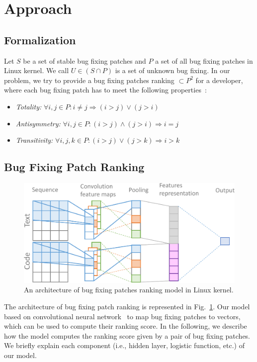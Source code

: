 \section{Approach}
\label{sec:approach}
\subsection{Formalization}
\label{sec:formalization}

Let $S$ be a set of stable bug fixing patches and $P$ a set of all bug fixing patches in Linux kernel. We call $U \in (S \cap P ) $ is a set of unknown bug fixing. In our problem, we try to provide a bug fixing patches ranking $\subset P^2$ for a developer, where each bug fixing patch has to meet the following properties~\cite{rendle2009bpr}:
\begin{itemize}
	\item \textit{Totality:} $\forall i,j \in P: i \neq j \Rightarrow (i > j) \vee (j > i)$
	\item \textit{Antisymmetry:} $\forall i,j \in P: (i > j) \wedge (j > i) \Rightarrow i = j$ 
	\item \textit{Transitivity:} $\forall i,j,k \in P: (i > j) \vee (j > k) \Rightarrow i > k$ 
\end{itemize}

\subsection{Bug Fixing Patch Ranking}
\label{sec:bugranking}
\begin{figure}[t!]
	\centering
	\includegraphics[width=1.0\textwidth]{BugPatchingRanking_v2-cropped.pdf}
	\caption{An architecture of bug fixing patches ranking model in Linux kernel.}
	\label{fig:bugranking}
\end{figure}

The architecture of bug fixing patch ranking is represented in Fig.~\ref{fig:bugranking}. Our model based on convolutional neural network~\cite{lecun1995convolutional} to map bug fixing patches to vectors, which can be used to compute their ranking score. In the following, we describe how the model computes the ranking score given by a pair of bug fixing patches. We briefly explain each component (i.e., hidden layer, logistic function, etc.) of our model.

